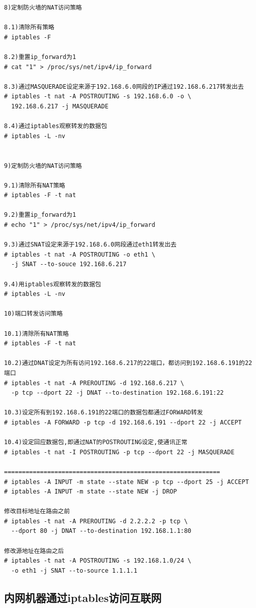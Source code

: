 \begin{verbatim}
8)定制防火墙的NAT访问策略

8.1)清除所有策略
# iptables -F

8.2)重置ip_forward为1
# cat "1" > /proc/sys/net/ipv4/ip_forward

8.3)通过MASQUERADE设定来源于192.168.6.0网段的IP通过192.168.6.217转发出去
# iptables -t nat -A POSTROUTING -s 192.168.6.0 -o \
  192.168.6.217 -j MASQUERADE

8.4)通过iptables观察转发的数据包
# iptables -L -nv


9)定制防火墙的NAT访问策略

9.1)清除所有NAT策略
# iptables -F -t nat

9.2)重置ip_forward为1
# echo "1" > /proc/sys/net/ipv4/ip_forward

9.3)通过SNAT设定来源于192.168.6.0网段通过eth1转发出去
# iptables -t nat -A POSTROUTING -o eth1 \
  -j SNAT --to-souce 192.168.6.217

9.4)用iptables观察转发的数据包
# iptables -L -nv

10)端口转发访问策略

10.1)清除所有NAT策略
# iptables -F -t nat

10.2)通过DNAT设定为所有访问192.168.6.217的22端口，都访问到192.168.6.191的22端口
# iptables -t nat -A PREROUTING -d 192.168.6.217 \
  -p tcp --dport 22 -j DNAT --to-destination 192.168.6.191:22

10.3)设定所有到192.168.6.191的22端口的数据包都通过FORWARD转发
# iptables -A FORWARD -p tcp -d 192.168.6.191 --dport 22 -j ACCEPT

10.4)设定回应数据包,即通过NAT的POSTROUTING设定,使通讯正常
# iptables -t nat -I POSTROUTING -p tcp --dport 22 -j MASQUERADE

============================================================
# iptables -A INPUT -m state --state NEW -p tcp --dport 25 -j ACCEPT
# iptables -A INPUT -m state --state NEW -j DROP

修改目标地址在路由之前
# iptables -t nat -A PREROUTING -d 2.2.2.2 -p tcp \
  --dport 80 -j DNAT --to-destination 192.168.1.1:80

修改源地址在路由之后
# iptables -t nat -A POSTROUTING -s 192.168.1.0/24 \
  -o eth1 -j SNAT --to-source 1.1.1.1
\end{verbatim}

\subsection{内网机器通过iptables访问互联网}
\label{sec:InternalMachineInternet}

